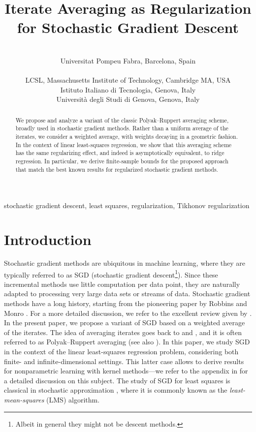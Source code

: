 \documentclass[final,12pt]{colt2018} %
\title[Iterate Averaging as Regularization for SGD]{Iterate Averaging as Regularization for Stochastic Gradient 
Descent}
\author{\Name{Gergely Neu} \Email{gergely.neu@gmail.com}\\
 \addr Universitat Pompeu Fabra, Barcelona, Spain \\
 \AND
 \Name{Lorenzo Rosasco} \Email{lrosasco@mit.edu}\\
 \addr LCSL, Massachusetts Institute of Technology, Cambridge MA, USA
 \\
 Istituto Italiano di Tecnologia, Genova, Italy
 \\
 Universit\`a degli Studi di Genova, Genova, Italy
 }
\begin{document}
\maketitle

\begin{abstract}
 We propose and analyze  a variant of the classic  Polyak--Ruppert averaging scheme,  broadly used in stochastic gradient methods.  Rather 
than  a uniform average of the iterates, we consider a weighted average, with  weights decaying in a  geometric fashion.   In the context of 
linear least-squares regression, we show that this averaging  scheme has the same regularizing effect, and indeed is asymptotically 
equivalent, to ridge regression. 
In particular, we derive finite-sample bounds for  the proposed approach that match  the best known results for regularized stochastic 
gradient methods.
\end{abstract} 


\begin{keywords}
stochastic gradient descent, least squares, regularization, Tikhonov regularization
\end{keywords}

\section{Introduction}

Stochastic gradient  methods are  ubiquitous in machine learning, where they are typically referred to as SGD (stochastic gradient 
descent\footnote{Albeit in general they might not  be descent methods.}). Since these incremental methods use little computation per data 
point, they are naturally adapted to processing very large data sets or streams of data.
Stochastic gradient methods have a long history, starting from the pioneering paper by Robbins and Monro \citep{RM51}. For a more 
detailed discussion, we refer to the excellent review given by \cite{NJLS09}. In the present paper, we propose a variant of SGD based on 
a weighted average of the iterates. The idea of averaging iterates goes back to \cite{P91} and \cite{R88}, and it is 
often referred to as Polyak--Ruppert averaging (see also \citealp{PJ92}).  In this paper, we study SGD in the context of the linear 
least-squares regression problem, considering both  finite- and infinite-dimensional settings. This latter  case allows to derive results 
for nonparametric learning with kernel methods---we refer to the appendix in \cite{RV15} for a detailed discussion on this subject. 
The study of SGD for least squares is classical in stochastic approximation \citep{K03}, where it is commonly known as the 
\emph{least-mean-squares} (LMS) algorithm.
\end{document}
